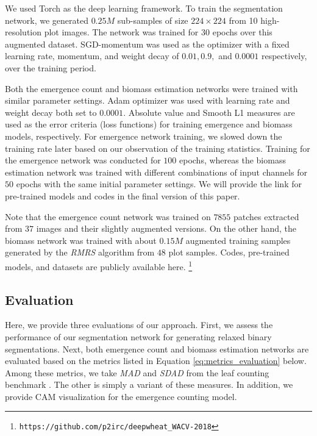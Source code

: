 \documentclass[10pt,twocolumn,letterpaper]{article}
\begin{document}
We used Torch \cite{torch} as the deep learning framework. To train the segmentation network, we generated $0.25M$ sub-samples of size $224\times224$ from 10 high-resolution plot images. The network was trained for $30$ epochs over this augmented dataset. SGD-momentum was used as the optimizer with a fixed learning rate, momentum, and weight decay of $0.01, 0.9,$ and $0.0001$ respectively, over the training period.


Both the emergence count and biomass estimation networks were trained with similar parameter settings. Adam optimizer \cite{adam} was used with learning rate and weight decay both set to $0.0001$. Absolute value and Smooth L1 measures \cite{fast-rcnn} are used as the error criteria (loss functions) for training emergence and biomass models, respectively. For emergence network training, we slowed down the training rate later based on our observation of the training statistics. Training for the emergence network was conducted for $100$ epochs, whereas the biomass estimation network was trained with different combinations of input channels for $50$ epochs with the same initial parameter settings. We will provide the link for pre-trained models and codes in the final version of this paper.

Note that the emergence count network was trained on $7855$ patches extracted from $37$ images and their slightly augmented versions. On the other hand, the biomass network was trained with about $0.15M$ augmented training samples generated by the \textit{RMRS} algorithm from $48$ plot samples. Codes, pre-trained models, and datasets are publicly available here. \footnote{\texttt{https://github.com/p2irc/deepwheat\_WACV{-}2018}}%

\subsection{Evaluation}

Here, we provide three evaluations of our approach. First, we assess the performance of our segmentation network for generating relaxed binary segmentations. Next, both emergence count and biomass estimation networks are evaluated based on the metrics listed in Equation \ref{eq:metrics_evaluation} below. Among these metrics, we take \textit{MAD} and \textit{SDAD} from the leaf counting benchmark \cite{aich-cvppp2017}. The other is simply a variant of these measures. In addition, we provide CAM visualization for the emergence counting model.
\end{document}
